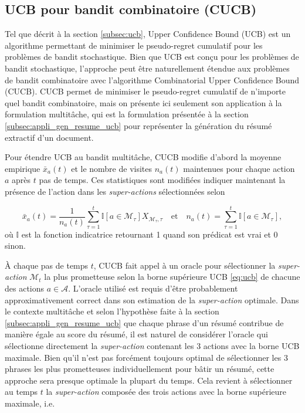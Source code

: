 
\subsection{UCB pour bandit combinatoire (CUCB)}
\label{subsec:ucb_combi}

Tel que décrit à la section \ref{subsec:ucb}, Upper Confidence Bound (UCB) \citep{ucb} est 
un algorithme permettant de minimiser le pseudo-regret cumulatif 
pour les problèmes de bandit stochastique.
Bien que UCB est conçu pour les problèmes de bandit stochastique, 
l'approche peut être naturellement étendue aux problèmes de bandit combinatoire
avec l'algorithme Combinatorial Upper Confidence Bound (CUCB).
CUCB permet de minimiser le pseudo-regret cumulatif de n'importe quel bandit combinatoire,
mais on présente ici seulement son application à la formulation multitâche, qui est la 
formulation présentée à la section \ref{subsec:appli_gen_resume_ucb} pour
représenter la génération du résumé extractif d'un document.

Pour étendre UCB au bandit multitâche, CUCB modifie d'abord la moyenne 
empirique $\bar{x}_a(t)$ et le nombre de visites $n_a(t)$ maintenues pour chaque 
action $a$ après $t$ pas de temps.
Ces statistiques sont modifiées indiquer maintenant la présence de l'action 
dans les \textit{super-actions} sélectionnées selon

\begin{equation*}
    \bar{x}_a (t) = \frac{1}{n_a (t)} \sum_{\tau = 1}^{t} \mathbb{I}\left[a \in \mathcal{M}_\tau\right] X_{\mathcal{M}_\tau, \tau} \quad \text{et} \quad
    n_a (t) = \sum_{\tau = 1}^{t} \mathbb{I}\left[a \in \mathcal{M}_\tau\right],
\end{equation*}
où $\mathbb{I}$ est la fonction indicatrice retournant 1 quand 
son prédicat est vrai et 0 sinon.

À chaque pas de temps $t$, CUCB fait appel à un oracle pour sélectionner
la \textit{super-action} $\mathcal{M}_t$ la plus prometteuse selon
la borne supérieure UCB \eqref{eq:ucb} de chacune des actions $a \in \mathcal{A}$.
L'oracle utilisé est requis d'être probablement approximativement 
correct dans son estimation de la \textit{super-action} optimale.
Dans le contexte multitâche et selon l'hypothèse faite à la section 
\ref{subsec:appli_gen_resume_ucb} que chaque phrase 
d'un résumé contribue de manière égale au score du résumé,
il est naturel de considérer l'oracle qui sélectionne directement
la \textit{super-action} contenant les 3 
actions avec la borne UCB maximale.
Bien qu'il n'est pas forcément toujours optimal de sélectionner 
les 3 phrases les plus prometteuses individuellement pour bâtir un 
résumé, cette approche sera presque optimale la plupart du temps.
Cela revient à sélectionner au temps $t$ la \textit{super-action} composée des trois actions
avec la borne supérieure maximale, i.e.


